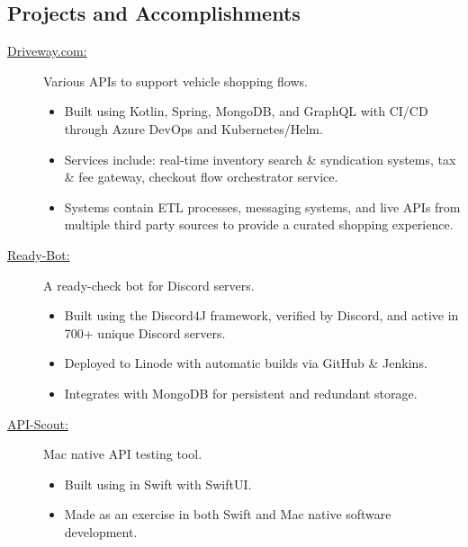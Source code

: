 \documentclass{article}
\def \intraspace {0.1em}
\begin{document}

\subsection*{Projects and Accomplishments}
    \begin{description}

        \item[\href{https://driveway.com/shop}{Driveway.com:\hspace{0.075in}}] Various APIs to support vehicle shopping flows.
            \begin{itemize}
                \item Built using Kotlin, Spring, MongoDB, and GraphQL with CI/CD through Azure DevOps and Kubernetes/Helm.
                \item Services include: real-time inventory search \& syndication systems, tax \& fee gateway, checkout flow orchestrator service.
                \item Systems contain ETL processes, messaging systems, and live APIs from multiple third party sources to provide a curated shopping experience.
            \end{itemize}

            \vspace{\intraspace}
        \item[\href{https://www.github.com/BurnsCommaLucas/ready-botlin}{Ready-Bot:\hspace{0.075in}}] A ready-check bot for Discord servers.
            \begin{itemize}
                \item Built using the Discord4J framework, verified by Discord, and active in 700+ unique Discord servers.
                \item Deployed to Linode with automatic builds via GitHub \& Jenkins.
                \item Integrates with MongoDB for persistent and redundant storage.
            \end{itemize}

            \vspace{\intraspace}

        \item[\href{https://github.com/BurnsCommaLucas/API-Scout}{API-Scout:\hspace{0.075in}}] Mac native API testing tool.
            \begin{itemize}
            	\item Built using in Swift with SwiftUI.
            	\item Made as an exercise in both Swift and Mac native software development.
            \end{itemize}


\end{description}
\end{document}
